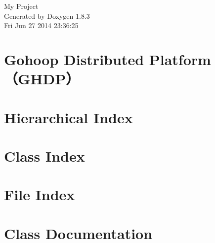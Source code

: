 \documentclass{book}
\begin{document}
\hypersetup{pageanchor=false,citecolor=blue}
\begin{titlepage}
\vspace*{7cm}
\begin{center}
{\Large My Project }\\
\vspace*{1cm}
{\large Generated by Doxygen 1.8.3}\\
\vspace*{0.5cm}
{\small Fri Jun 27 2014 23:36:25}\\
\end{center}
\end{titlepage}
\clearemptydoublepage
{}
\tableofcontents
\clearemptydoublepage
{}
\hypersetup{pageanchor=true,citecolor=blue}
\chapter{Gohoop Distributed Platform（\-G\-H\-D\-P）}
\label{index}\hypertarget{index}{}
\chapter{Hierarchical Index}

\chapter{Class Index}

\chapter{File Index}

\chapter{Class Documentation}
































\end{document}
